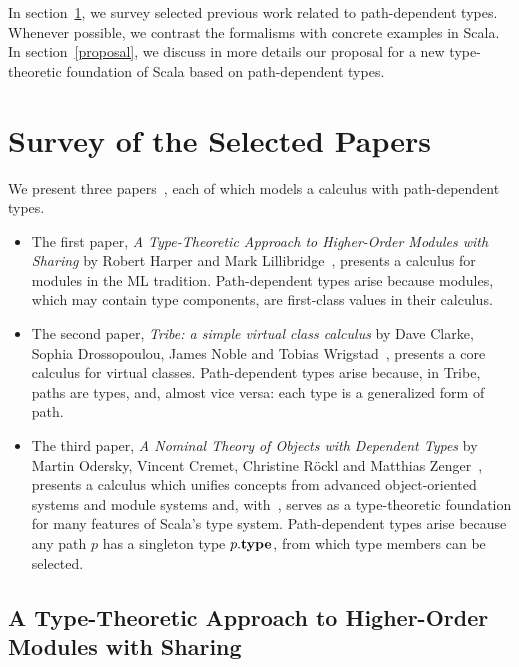 \documentclass[10pt,journal,a4paper]{IEEEtran}
\begin{document}
In section~\ref{survey}, we survey selected previous work related to
path-dependent types. Whenever possible, we contrast the formalisms
with concrete examples in Scala. In section~\ref{proposal}, we discuss
in more details our proposal for a new type-theoretic foundation of
Scala based on path-dependent types.

\section{Survey of the Selected Papers}\label{survey}%

We present three papers~\cite{homl,tribe,nuObj}, each of which models
a calculus with path-dependent types.
\begin{itemize}
\item The first paper, {\it A Type-Theoretic Approach to Higher-Order
  Modules with Sharing} by Robert Harper and Mark
  Lillibridge~\cite{homl}, presents a calculus for modules in the ML
  tradition. Path-dependent types arise because modules, which may
  contain type components, are first-class values in their calculus.
\item The second paper, {\it Tribe: a simple virtual class calculus}
  by Dave Clarke, Sophia Drossopoulou, James Noble and Tobias
  Wrigstad~\cite{tribe}, presents a core calculus for virtual
  classes. Path-dependent types arise because, in Tribe, paths are
  types, and, almost vice versa: each type is a generalized form of
  path.
\item The third paper, {\it A Nominal Theory of Objects with Dependent
  Types} by Martin Odersky, Vincent Cremet, Christine R{\"o}ckl and
  Matthias Zenger~\cite{nuObj}, presents a calculus which unifies
  concepts from advanced object-oriented systems and module systems
  and, with~\cite{FS}, serves as a type-theoretic foundation for many
  features of Scala's type system. Path-dependent types arise because
  any path $p$ has a singleton type $p.\relax{\bf type}$, from which type members
  can be selected.
\end{itemize}


\subsection{A Type-Theoretic Approach to Higher-Order Modules with Sharing}\label{sec:homl}
\end{document}
